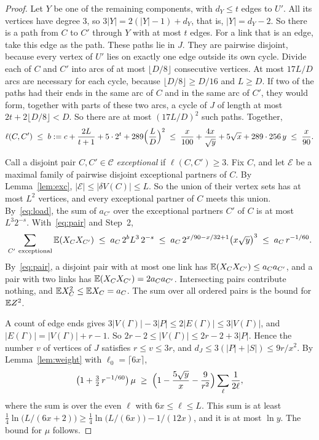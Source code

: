 \begin{proof}
Let $Y$ be one of the remaining components, with $d_Y\le t$ edges to $U'$. All its vertices have
degree $3$, so $3|Y|=2(|Y|-1)+d_Y$, that is, $|Y|=d_Y-2$. So there is a path from $C$ to $C'$
through $Y$ with at most $t$ edges. For a link that is an edge, take this edge as the path. These
paths lie in $J$. They are pairwise disjoint, because every vertex of $U'$ lies on exactly one
edge outside its own cycle. Divide each of $C$ and $C'$ into arcs of at most $\lfloor D/8\rfloor$
consecutive vertices. At most $17L/D$ arcs are necessary for each cycle, because
$\lfloor D/8\rfloor\ge D/16$ and $L\ge D$. If two of the paths had their ends in the same arc of
$C$ and in the same arc of $C'$, they would form, together with parts of these two arcs, a cycle
of $J$ of length at most $2t+2\lfloor D/8\rfloor<D$. So there are at most $(17L/D)^{2}$ such
paths. Together,
\[
  \ell(C,C')\;\le\;b:=c+\frac{2L}{t+1}+5\cdot2^{t}+289\Bigl(\frac LD\Bigr)^{2}
  \;\le\;\frac{x}{100}+\frac{4x}{\sqrt y}+5\sqrt x+289\cdot256\,y\;\le\;\frac{x}{90}.
\]

 Call a disjoint pair $C,C'\in\mathcal{C}$ \emph{exceptional} if
$\ell(C,C')\ge3$. Fix $C$, and let $\mathcal{E}$ be a maximal family of pairwise disjoint
exceptional partners of $C$. By Lemma~\ref{lem:exc}, $|\mathcal{E}|\le|\delta V(C)|\le L$. So the
union of their vertex sets has at most $L^{2}$ vertices, and every exceptional partner of $C$
meets this union. By~\eqref{eq:load}, the sum of $a_{C'}$ over the exceptional partners $C'$ of $C$
is at most $L^{3}2^{-s}$. With~\eqref{eq:pair} and Step~2,
\[
  \sum_{C'\ \mathrm{exceptional}}\EE(X_CX_{C'})\;\le\;a_C\,2^{b}L^{3}\,2^{-s}
  \;\le\;a_C\,2^{x/90-x/32+1}\bigl(x\sqrt y\bigr)^{3}\;\le\;a_C\,r^{-1/60}.
\]
By~\eqref{eq:pair}, a disjoint pair with at most one link has $\mathbb{E}(X_CX_{C'})\le a_Ca_{C'}$, and
a pair with two links has $\mathbb{E}(X_CX_{C'})=2a_Ca_{C'}$. Intersecting pairs contribute nothing, and
$\mathbb{E} X_C^{2}\le\mathbb{E} X_C=a_C$. The sum over all ordered pairs is the bound for $\mathbb{E} Z^{2}$.

 A count of edge ends gives
$3|V(\Gamma)|-3|P|\le2|E(\Gamma)|\le3|V(\Gamma)|$, and $|E(\Gamma)|=|V(\Gamma)|+r-1$. So
$2r-2\le|V(\Gamma)|\le2r-2+3|P|$. Hence the number $v$ of vertices of $J$ satisfies
$r\le v\le3r$, and $d_J\le3(|P|+|S|)\le9r/x^{2}$. By Lemma~\ref{lem:weight} with
$\ell_0=\lceil6x\rceil$,
\[
  \bigl(1+\tfrac32\,r^{-1/60}\bigr)\,\mu\;\ge\;
  \Bigl(1-\frac{5\sqrt y}{x}-\frac{9}{r^{2}}\Bigr)\sum_{\ell}\frac1{2\ell},
\]
where the sum is over the even $\ell$ with $6x\le\ell\le L$. This sum is at least
$\frac14\ln\bigl(L/(6x+2)\bigr)\ge\frac14\ln\bigl(L/(6x)\bigr)-1/(12x)$, and it is at most $\ln y$.
The bound for $\mu$ follows.
\end{proof}

